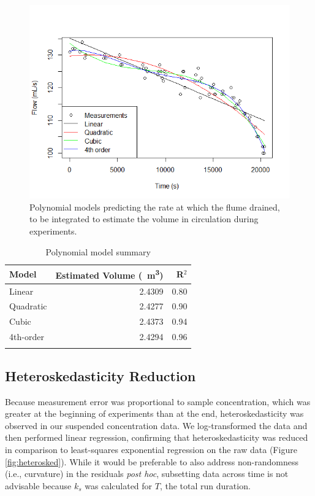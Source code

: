 \documentclass[geosciences,article,submit,moreauthors,pdftex]{Definitions/mdpi}
\begin{document}
\begin{figure}[H]
\centering
\includegraphics[width=5in]{../pics/flumevol.png}
\caption{Polynomial models predicting the rate at which the flume drained, to be integrated to estimate the volume in circulation during experiments.}
\label{fig:flumevol}
\end{figure}

\begin{table}[H]
\caption{Polynomial model summary}
\centering
\begin{tabular}{lrr}
\toprule
\textbf{Model}&\textbf{Estimated Volume (\SI{}{\metre\cubed})}&\textbf{R$^2$}\\
\midrule
Linear       &  2.4309     &   0.80\\
Quadratic    &  2.4277     &   0.90\\
Cubic        &  2.4373     &   0.94\\
4th-order    &  2.4294     &   0.96\\
\bottomrule
\label{tbl:flumevol}
\end{tabular}
\end{table}

\subsection{Heteroskedasticity Reduction}

Because measurement error was proportional to sample concentration, which was greater at the beginning of experiments than at the end, heteroskedasticity was observed in our suspended concentration data. We log-transformed the data and then performed linear regression, confirming that heteroskedasticity was reduced in comparison to least-squares exponential regression on the raw data (Figure \ref{fig:heterosked}). While it would be preferable to also address non-randomness (i.e., curvature) in the residuals \textit{post hoc}, subsetting data across time is not advisable because $k_s$ was calculated for $T$, the total run duration.
\end{document}

